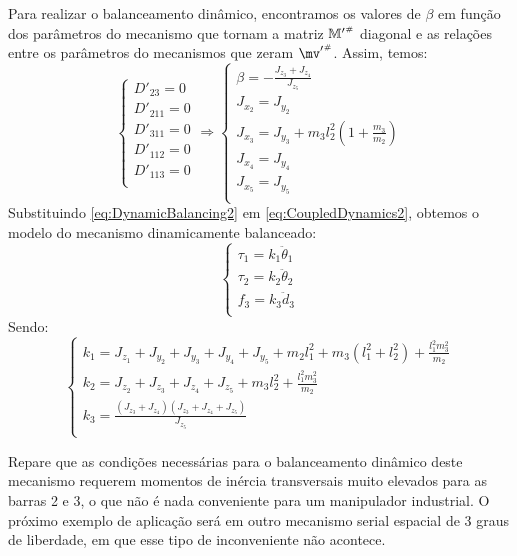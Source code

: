 \documentclass[a4paper,11pt,brazil,fleqn]{article}
\begin{document}
Para realizar o balanceamento din\^{a}mico, encontramos os valores de $\beta$ em fun\c{c}\~{a}o dos par\^ametros do mecanismo que tornam a matriz ${\mathbb{M}'}^{\scriptscriptstyle \#}$ diagonal e as rela\c{c}\~{o}es entre os par\^{a}metros do mecanismos que zeram ${\mv'}\ssh$. Assim, temos:
\begin{equation}\label{eq:DynamicBalancing2}
\begin{cases}
D'_{23} = 0 \\
D'_{211} = 0 \\
D'_{311} = 0 \\
D'_{112} = 0 \\
D'_{113} = 0 \\
\end{cases}
\Rightarrow
\begin{cases}
\beta = -\frac{J_{z_3}+J_{z_4}}{J_{z_5}} \\
J_{x_2} = J_{y_2} \\
J_{x_3} = J_{y_3} + m_3 l_2^2 ( 1 + \frac{m_3}{m_2} )\\
J_{x_4} = J_{y_4} \\
J_{x_5} = J_{y_5} \\
\end{cases}
\end{equation}
Substituindo \eqref{eq:DynamicBalancing2} em \eqref{eq:CoupledDynamics2}, obtemos o modelo do mecanismo dinamicamente balanceado:
\begin{equation}\label{eq:DynamicBalanced2}
\begin{cases}
\tau_1 = k_1 \ddot{\theta}_1 \\
\tau_2 = k_2 \ddot{\theta}_2 \\
f_3 = k_3 \ddot{d}_3 \\
\end{cases}
\end{equation}
Sendo:
\begin{equation}\label{eq:DynamicBalancedKs2}
\begin{cases}
k_1 = J_{z_1} + J_{y_2} + J_{y_3} + J_{y_4} + J_{y_5} + m_2 l_1^2 + m_3 (l_1^2 + l_2^2) + \frac{l_1^2 m_3^2}{m_2} \\
k_2 =  J_{z_2} + J_{z_3} + J_{z_4} + J_{z_5} + m_3 l_2^2 + \frac{l_1^2 m_3^2}{m_2}\\
k_3 = \frac{(J_{z_3}+J_{z_4})(J_{z_3}+J_{z_4}+J_{z_5})}{J_{z_5}} \\
\end{cases}
\end{equation}

Repare que as condi\c{c}\~oes necess\'{a}rias para o balanceamento din\^{a}mico deste mecanismo requerem momentos de in\'{e}rcia transversais muito elevados para as barras 2 e 3, o que n\~{a}o \'{e} nada conveniente para um manipulador industrial. O pr\'{o}ximo exemplo de aplica\c{c}\~{a}o ser\'{a} em outro mecanismo serial espacial de 3 graus de liberdade, em que esse tipo de inconveniente n\~{a}o acontece.
\end{document}
